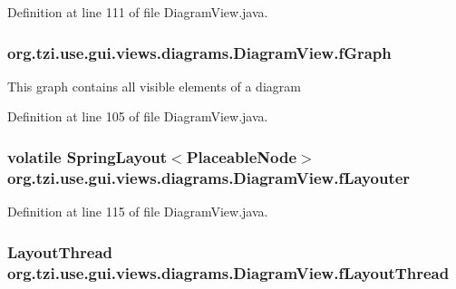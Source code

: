 Definition at line 111 of file Diagram\-View.\-java.

\hypertarget{classorg_1_1tzi_1_1use_1_1gui_1_1views_1_1diagrams_1_1_diagram_view_ad51196cb0d6dbed13e117f00464ba0dc}{
\subsubsection[{f\-Graph}]{ org.\-tzi.\-use.\-gui.\-views.\-diagrams.\-Diagram\-View.\-f\-Graph\hspace{0.3cm}{\ttfamily [protected]}}}\label{classorg_1_1tzi_1_1use_1_1gui_1_1views_1_1diagrams_1_1_diagram_view_ad51196cb0d6dbed13e117f00464ba0dc}
This graph contains all visible elements of a diagram 

Definition at line 105 of file Diagram\-View.\-java.

\hypertarget{classorg_1_1tzi_1_1use_1_1gui_1_1views_1_1diagrams_1_1_diagram_view_ae8a066af026f76702fa68173e0aa5180}{
\subsubsection[{f\-Layouter}]{\setlength{\rightskip}{0pt plus 5cm}volatile Spring\-Layout$<${\bf Placeable\-Node}$>$ org.\-tzi.\-use.\-gui.\-views.\-diagrams.\-Diagram\-View.\-f\-Layouter\hspace{0.3cm}{\ttfamily [protected]}}}\label{classorg_1_1tzi_1_1use_1_1gui_1_1views_1_1diagrams_1_1_diagram_view_ae8a066af026f76702fa68173e0aa5180}


Definition at line 115 of file Diagram\-View.\-java.

\hypertarget{classorg_1_1tzi_1_1use_1_1gui_1_1views_1_1diagrams_1_1_diagram_view_aab5d34422e54c95bcb73d6a0df6da610}{
\subsubsection[{f\-Layout\-Thread}]{\setlength{\rightskip}{0pt plus 5cm}Layout\-Thread org.\-tzi.\-use.\-gui.\-views.\-diagrams.\-Diagram\-View.\-f\-Layout\-Thread\hspace{0.3cm}{\ttfamily [protected]}}}\label{classorg_1_1tzi_1_1use_1_1gui_1_1views_1_1diagrams_1_1_diagram_view_aab5d34422e54c95bcb73d6a0df6da610}


